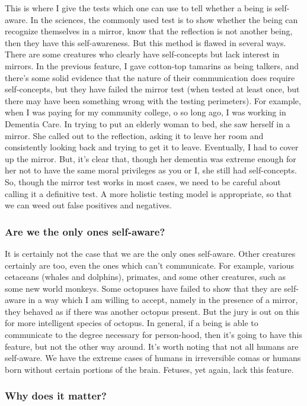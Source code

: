 This is where I give the tests which one can use to tell whether a being is self-aware. In the sciences, the commonly used test is to show whether the being can recognize themselves in a mirror, know that the reflection is not another being, then they have this self-awareness.  But this method is flawed in several ways. There are some creatures who clearly have self-concepts but lack interest in mirrors. In the previous feature, I gave cotton-top tamarins as being talkers, and there's some solid evidence that the nature of their communication does require self-concepts, but they have failed the mirror test (when tested at least once, but there may have been something wrong with the testing perimeters). For example, when I was paying for my community college, o so long ago, I was working in Dementia Care. In trying to put an elderly woman to bed, she saw herself in a mirror. She called out to the reflection, asking  it to leave her room and consistently looking back and trying to get it to leave. Eventually, I had to cover up the mirror. But, it's clear that, though her dementia was extreme enough for her not to have the same moral privileges as you or I, she still had self-concepts.  So, though the mirror test works in most cases, we need to be careful about calling it a definitive test. A more holistic testing model is appropriate, so that we can weed out false positives and negatives.  
\subsubsection{Are we the only ones self-aware?}

It is certainly not the case that we are the only ones self-aware. Other creatures certainly are too, even the ones which can't communicate. For example, various cetaceans (whales and dolphins), primates, and some other creatures, such as some new world monkeys.  Some octopuses have failed to show that they are self-aware in a way which I am willing to accept, namely in the presence of a mirror, they behaved as if there was another octopus present. But the jury is out on this for more intelligent species of octopus. In general, if a being is able to communicate to the degree necessary for person-hood, then it's going to have this feature, but not the other way around. It's worth noting that not all humans are self-aware. We have the extreme cases of humans in irreversible comas or humans born without certain portions of the brain. Fetuses, yet again, lack this feature. 
\subsubsection{Why does it matter?}

